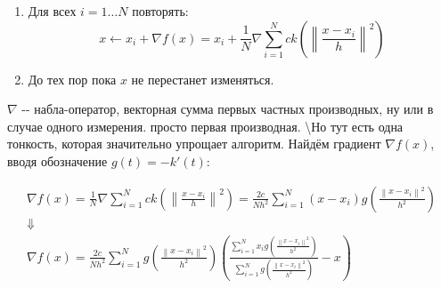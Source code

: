 \documentclass[11pt]{article}
\begin{document}
\begin{enumerate}
\item Для всех $i=1 \ldots N$ повторять:
$$
x \gets x_i + \nabla f(x) = x_i + \frac{1}{N}\nabla\sum\limits_{i = 1}^{N}ck\left(\left\|\frac{x - x_i}{h}\right\|^2\right)
$$
\item До тех пор пока $x$ не перестанет изменяться.
\end{enumerate}

$\nabla$ -\/- набла-оператор, векторная сумма первых частных
производных, ну или в случае одного измерения. просто первая
производная. \textbackslash{}Но тут есть одна тонкость, которая
значительно упрощает алгоритм. Найдём градиент $\nabla f(x)$, вводя
обозначение $g(t) = -k'(t)$:

\begin{gather*}
\nabla f(x) = \frac{1}{N}\nabla\sum\limits_{i = 1}^{N}ck\left(\left\|\frac{x - x_i}{h}\right\|^2\right) = \frac{2c}{Nh^2}\sum\limits_{i = 1}^{N}\left(x - x_i \right)g\left(\frac{\left\|x - x_i\right\|^2}{h^2}\right) \\
\Downarrow \\
\nabla f(x) = \frac{2c}{Nh^2}\sum\limits_{i = 1}^{N}g\left(\frac{\left\|x - x_i\right\|^2}{h^2}\right)\left(\frac{\sum\limits_{i = 1}^{N}x_i g\left(\frac{\left\|x - x_i\right\|^2}{h^2}\right)}{\sum\limits_{i = 1}^{N}g\left(\frac{\left\|x - x_i\right\|^2}{h^2}\right)} - x \right)
\end{gather*}
\end{document}
